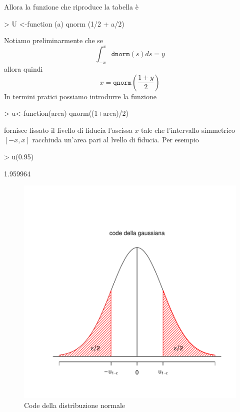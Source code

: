 \documentclass[onecolumn,12pt]{book}
\begin{document}
Allora la funzione che riproduce la tabella è
 
\begin{Schunk}
\begin{Sinput}
> U <-function (a) qnorm (1/2 + a/2)
\end{Sinput}
\end{Schunk}
Notiamo preliminarmente che
se $$ \int_{-x}^x \texttt{dnorm}(s)ds= y$$ allora
 quindi
$$x=\texttt{qnorm}\left(\frac{1+y}{2}\right)$$
In termini pratici possiamo introdurre la funzione
\begin{Schunk}
\begin{Sinput}
> u<-function(area) qnorm((1+area)/2)
\end{Sinput}
\end{Schunk}
fornisce fissato il livello di fiducia l'ascissa $x$  tale che l'intervallo simmetrico $[-x,x]$ racchiuda un'area pari al lvello di fiducia. Per esempio
\begin{Schunk}
\begin{Sinput}
> u(0.95)
\end{Sinput}
\begin{Soutput}
[1] 1.959964
\end{Soutput}
\end{Schunk}
\begin{figure}[htbp]
\begin{center}
\includegraphics{RbookParte2-077}
\caption{Code della distribuzione normale}
\label{normaletratto}
\end{center}
\end{figure}
\end{document}
